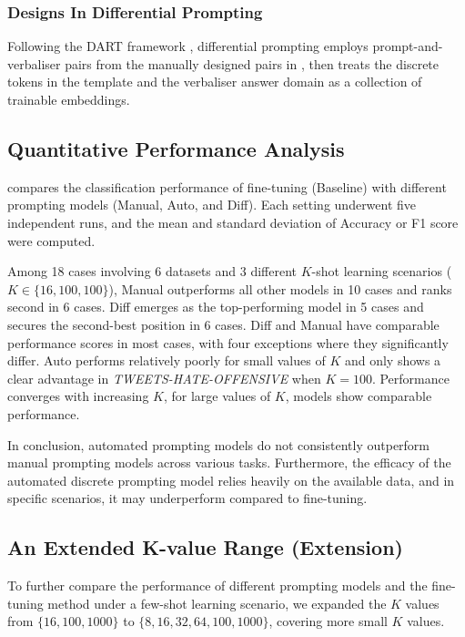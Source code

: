 \vspace{-0.3em}
\subsubsection{Designs In Differential Prompting}
Following the DART framework \cite{zhang2021differentiable}, differential prompting employs prompt-and-verbaliser pairs from the manually designed pairs in , then treats the discrete tokens in the template and the verbaliser answer domain as a collection of trainable embeddings.

\subsection{Quantitative Performance Analysis}
 compares the classification performance of fine-tuning (Baseline) with different prompting models (Manual, Auto, and Diff). Each setting underwent five independent runs, and the mean and standard deviation of Accuracy or F1 score were computed.

Among 18 cases involving 6 datasets and 3 different $K$-shot learning scenarios ($K \in \{16, 100, 100\}$), Manual outperforms all other models in 10 cases and ranks second in 6 cases. Diff emerges as the top-performing model in 5 cases and secures the second-best position in 6 cases. Diff and Manual have comparable performance scores in most cases, with four exceptions where they significantly differ. Auto performs relatively poorly for small values of $K$ and only shows a clear advantage in \textit{TWEETS-HATE-OFFENSIVE} when $K = 100$. Performance converges with increasing $K$, for large values of $K$, models show comparable performance.  


In conclusion, automated prompting models do not consistently outperform manual prompting models across various tasks. Furthermore, the efficacy of the automated discrete prompting model relies heavily on the available data, and in specific scenarios, it may underperform compared to fine-tuning.

\subsection{An Extended K-value Range (Extension)} \label{sec:eval_more_k}
To further compare the performance of different prompting models and the fine-tuning method under a few-shot learning scenario, we expanded the $K$ values from $\{16, 100, 1000\}$ to $\{8, 16, 32, 64, 100, 1000\}$, covering more small $K$ values.

